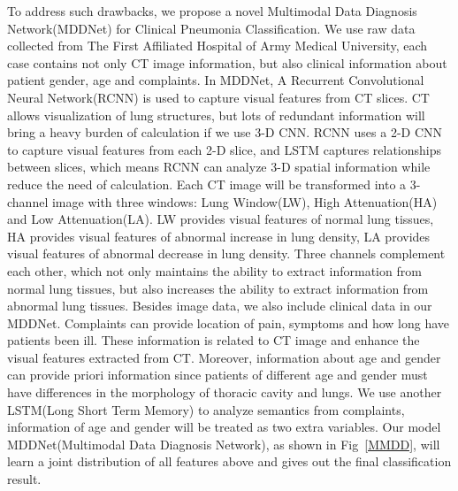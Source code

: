 \documentclass[journal]{IEEEtran}
\begin{document}
To address such drawbacks, we propose a novel Multimodal Data Diagnosis Network(MDDNet) for Clinical Pneumonia Classification. We use raw data collected from The First Affiliated Hospital of Army Medical University, each case contains not only CT image information, but also clinical information about patient gender, age and complaints. 
In MDDNet, A Recurrent Convolutional Neural Network(RCNN) is used to capture visual features from CT slices. CT allows visualization of lung structures, but lots of redundant information will bring a heavy burden of calculation if we use 3-D CNN. RCNN uses a 2-D CNN to capture visual features from each 2-D slice, and LSTM captures relationships between slices, which means RCNN can analyze 3-D spatial information while reduce the need of calculation. Each CT image will be transformed into a 3-channel image with three windows: Lung Window(LW), High Attenuation(HA) and Low Attenuation(LA). LW provides visual features of normal lung tissues, HA provides visual features of abnormal increase in lung density, LA provides visual features of abnormal decrease in lung density. Three channels complement each other, which not only maintains the ability to extract information from normal lung tissues, but also increases the ability to extract information from abnormal lung tissues.
Besides image data, we also include clinical data in our MDDNet. Complaints can provide location of pain, symptoms and how long have patients been ill. These information is related to CT image and enhance the visual features extracted from CT. Moreover, information about age and gender can provide priori information since patients of different age and gender must have differences in the morphology of thoracic cavity and lungs. We use another LSTM(Long Short Term Memory) to analyze semantics from complaints, information of age and gender will be treated as two extra variables. Our model MDDNet(Multimodal Data Diagnosis Network), as shown in Fig~\ref{MMDD}, will learn a joint distribution of all features above and gives out the final classification result.
\end{document}
